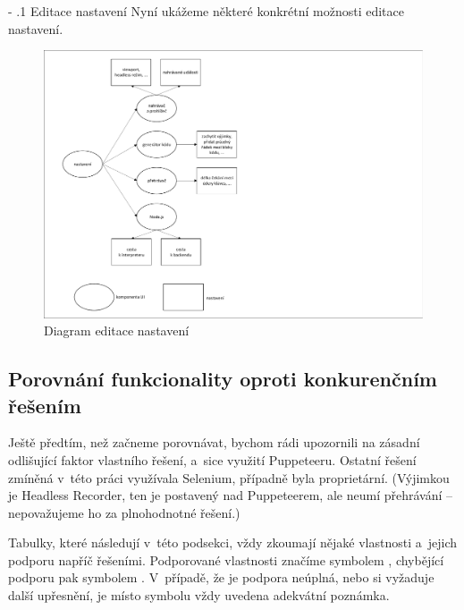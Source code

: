 \documentclass[12pt, a4paper, twoside]{article}
\makeatletter
\newcommand{\cmark}{\ding{51}}
\newcommand{\xmark}{\ding{55}}
\renewcommand\paragraph{%
	\@startsection{subparagraph}{5}{0mm}%
	{-\baselineskip}%
	{.1\baselineskip}%
	{\normalfont\normalsize\bfseries}}
\makeatother
\begin{document}
	\paragraph{Editace nastavení}
	Nyní ukážeme některé konkrétní možnosti editace nastavení.
	\nopagebreak
	\begin{figure}[H]
		\centering
		\includegraphics[width=1.0\textwidth]{settingsDiagram.pdf}
		\caption{Diagram editace nastavení}
	\end{figure}
	\newpage
	\subsection{Porovnání funkcionality oproti konkurenčním řešením}
	\label{sub_sec:functionalityComparison}
	Ještě předtím, než začneme porovnávat, bychom rádi upozornili na zásadní odlišující faktor vlastního řešení, a~sice využití Puppeteeru. Ostatní řešení zmíněná v~této práci využívala Selenium, případně byla proprietární. (Výjimkou je Headless Recorder, ten je postavený nad Puppeteerem, ale neumí přehrávání -- nepovažujeme ho za plnohodnotné řešení.)
	
	Tabulky, které následují v~této podsekci, vždy zkoumají nějaké vlastnosti a~jejich podporu napříč řešeními. Podporované vlastnosti značíme symbolem \cmark, chybějící podporu pak symbolem \xmark. V~případě, že je podpora neúplná, nebo si vyžaduje další upřesnění, je místo symbolu vždy uvedena adekvátní poznámka.
	\newpage
	\phantom{c}
	\vspace{0.7cm}
\end{document}
